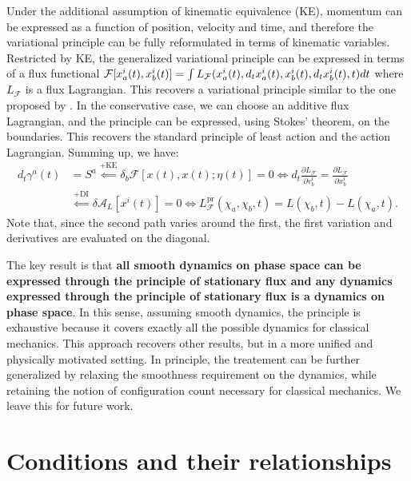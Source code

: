 \documentclass[12pt]{article}
\begin{document}
Under the additional assumption of kinematic equivalence (KE), momentum can be expressed as a function of position, velocity and time, and therefore the variational principle can be fully reformulated in terms of kinematic variables. Restricted by KE, the generalized variational principle can be expressed in terms of a flux functional $\mathcal{F}[x^i_a(t), x^i_b(t)] = \int L_{\mathcal{F}}(x^i_a(t), d_t x^i_a(t), \linebreak x^i_b(t), d_t x^i_b(t), t)dt$ where $L_{\mathcal{F}}$ is a flux Lagrangian. This recovers a variational principle similar to the one proposed by \cite{galley,galleytsangstein}. In the conservative case, we can choose an additive flux Lagrangian, and the principle can be expressed, using Stokes' theorem, on the boundaries. This recovers the standard principle of least action and the action Lagrangian. Summing up, we have:
\begin{equation}
	\begin{aligned}
		d_t \gamma^a(t) &= S^a \stackrel{\text{+KE}}{\impliedby} \delta_b\mathcal{F}[x(t),x(t);\eta(t)]=0 \iff d_t\frac{\partial L_{\mathcal{F}}}{\partial v_b^i}=\frac{\partial L_{\mathcal{F}}}{\partial x_b^i} \\&\stackrel{\text{+DI}}{\impliedby} \delta \mathcal{A}_L[x^i(t)] = 0 \iff L_{\mathcal{F}}^{\mathrm{pr}}(\chi_a,\chi_b,t)=L(\chi_b,t)-L(\chi_a,t).
	\end{aligned}
\end{equation}
Note that, since the second path varies around the first, the first variation and derivatives are evaluated on the diagonal.

The key result is that \textbf{all smooth dynamics on phase space can be expressed through the principle of stationary flux and any dynamics expressed through the principle of stationary flux is a dynamics on phase space}. In this sense, assuming smooth dynamics, the principle is exhaustive because it covers exactly all the possible dynamics for classical mechanics. This approach recovers other results, but in a more unified and physically motivated setting. In principle, the treatement can be further generalized by relaxing the  smoothness requirement on the dynamics, while retaining the notion of configuration count necessary for classical mechanics. We leave this for future work.

\section{Conditions and their relationships}
\end{document}
